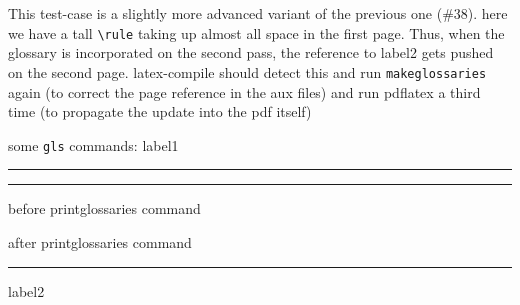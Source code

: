 \documentclass{article}
\begin{document}
This test-case is a slightly more advanced variant of the previous one
(\#38). here we have a tall \verb+\rule+ taking up almost all space in
the first page. Thus, when the  glossary is incorporated on the second
pass,  the  reference  to  label2  gets pushed  on  the  second  page.
latex-compile should detect this and run \texttt{makeglossaries} again
(to correct  the page reference in  the aux files) and  run pdflatex a
third time (to propagate the update into the pdf itself)

some \texttt{gls} commands: 
\gls{label1}

\bigskip

\rule{1pt}{14cm}



\hrule
before printglossaries command

\printglossaries

after printglossaries command
\hrule

\gls{label2}
\end{document}
